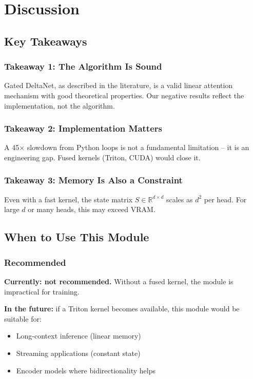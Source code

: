 
\section{Discussion}

\subsection{Key Takeaways}

\subsubsection{Takeaway 1: The Algorithm Is Sound}

Gated DeltaNet, as described in the literature, is a valid linear attention 
mechanism with good theoretical properties. Our negative results reflect 
the implementation, not the algorithm.

\subsubsection{Takeaway 2: Implementation Matters}

A 45$\times$ slowdown from Python loops is not a fundamental limitation -- it is 
an engineering gap. Fused kernels (Triton, CUDA) would close it.

\subsubsection{Takeaway 3: Memory Is Also a Constraint}

Even with a fast kernel, the state matrix $S \in \mathbb{R}^{d \times d}$ 
scales as $d^2$ per head. For large $d$ or many heads, this may exceed 
VRAM.

\subsection{When to Use This Module}

\subsubsection{Recommended}

\textbf{Currently: not recommended.} Without a fused kernel, the module is 
impractical for training.

\textbf{In the future:} if a Triton kernel becomes available, this module 
would be suitable for:
\begin{itemize}
\item Long-context inference (linear memory)
\item Streaming applications (constant state)
\item Encoder models where bidirectionality helps

\end{itemize}
